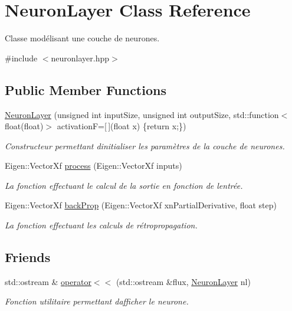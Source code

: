 \hypertarget{classNeuronLayer}{}\section{Neuron\+Layer Class Reference}
\label{classNeuronLayer}


Classe modélisant une couche de neurones.  




{\ttfamily \#include $<$neuronlayer.\+hpp$>$}

\subsection*{Public Member Functions}
\begin{DoxyCompactItemize}
\item 
\hyperlink{classNeuronLayer_a6202abd2b8ed9f8c08863917810b75ae}{Neuron\+Layer} (unsigned int input\+Size, unsigned int output\+Size, std\+::function$<$ float(float)$>$ activationF=\mbox{[}$\,$\mbox{]}(float x) \{return x;\})
\begin{DoxyCompactList}\small\item\em Constructeur permettant d\textquotesingle{}initialiser les paramètres de la couche de neurones. \end{DoxyCompactList}\item 
Eigen\+::\+Vector\+Xf \hyperlink{classNeuronLayer_aa374ba7d040ae618b5037aa88e5efae7}{process} (Eigen\+::\+Vector\+Xf inputs)
\begin{DoxyCompactList}\small\item\em La fonction effectuant le calcul de la sortie en fonction de l\textquotesingle{}entrée. \end{DoxyCompactList}\item 
Eigen\+::\+Vector\+Xf \hyperlink{classNeuronLayer_a0896580aa265681f77efbcb81c6c8150}{back\+Prop} (Eigen\+::\+Vector\+Xf xn\+Partial\+Derivative, float step)
\begin{DoxyCompactList}\small\item\em La fonction effectuant les calculs de rétropropagation. \end{DoxyCompactList}\end{DoxyCompactItemize}
\subsection*{Friends}
\begin{DoxyCompactItemize}
\item 
std\+::ostream \& \hyperlink{classNeuronLayer_adbe40702c22550c0392b3447e5d63c9a}{operator$<$$<$} (std\+::ostream \&flux, \hyperlink{classNeuronLayer}{Neuron\+Layer} nl)
\begin{DoxyCompactList}\small\item\em Fonction utilitaire permettant d\textquotesingle{}afficher le neurone. \end{DoxyCompactList}\end{DoxyCompactItemize}


